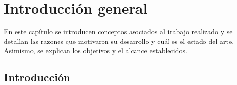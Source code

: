 
\chapter{Introducción general} %

\label{Chapter1} %
\label{IntroGeneral}


\newcommand{\keyword}[1]{\textbf{#1}}
\newcommand{\tabhead}[1]{\textbf{#1}}
\newcommand{\code}[1]{\texttt{#1}}
\newcommand{\file}[1]{\texttt{\bfseries#1}}
\newcommand{\option}[1]{\texttt{\itshape#1}}
\newcommand{\grados}{$^{\circ}$}


En este capítulo se introducen conceptos asociados al trabajo realizado y se detallan las razones que motivaron su desarrollo y cuál es el estado del arte. Asimismo, se explican los objetivos y el alcance establecidos.
\section{Introducción}
\label{Introducción}



